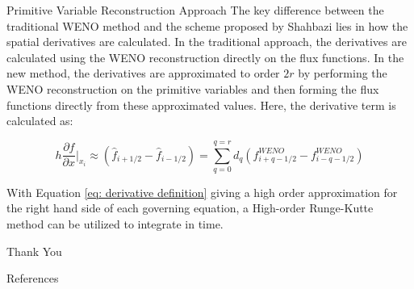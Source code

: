 \documentclass[10pt]{beamer}
\begin{document}
\begin{frame}{Primitive Variable Reconstruction Approach}
The key difference between the traditional WENO method and the scheme proposed by Shahbazi \cite{Shahbazi} lies in how the spatial derivatives are calculated.  In the traditional approach, the derivatives are calculated using the WENO reconstruction directly on the flux functions.   In the new method, the derivatives are approximated to order $2r$ by performing the WENO reconstruction on the primitive variables and then forming the flux functions directly from these approximated values.  Here, the derivative term is calculated as:     

\begin{equation}
h\frac{\partial f}{\partial x}\bigg|_{x_i}\approx (\hat{f}_{i+1/2}-\hat{f}_{i-1/2}) = \sum_{q=0}^{q=r}d_q(f^{WENO}_{i+q-1/2}-f^{WENO}_{i-q-1/2})
\label{eq: derivative definition}
\end{equation}  

With Equation \ref{eq: derivative definition} giving a high order approximation for the right hand side of each governing equation, a High-order Runge-Kutte method can be utilized to integrate in time. 

\end{frame}


\begin{frame}[standout]
  Thank You
\end{frame}

\appendix

\begin{frame}[allowframebreaks]{References}

  
  

\end{frame}
\end{document}
